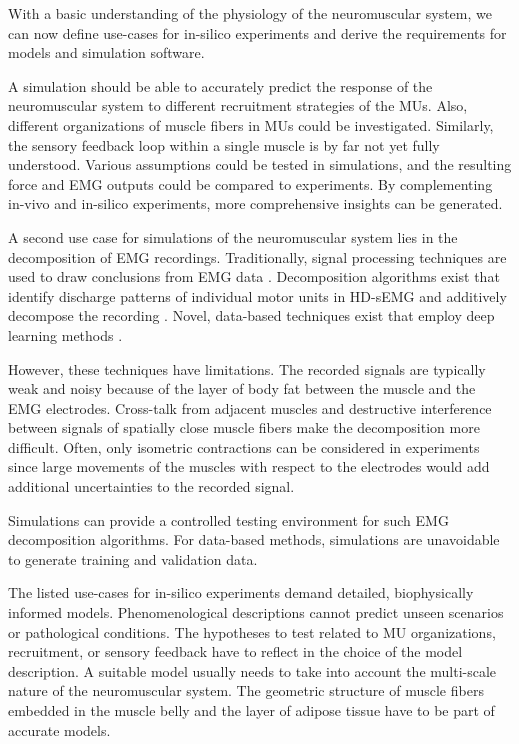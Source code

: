 With a basic understanding of the physiology of the neuromuscular system, we can now define use-cases for in-silico experiments and derive the requirements for models and simulation software.

A simulation should be able to accurately predict the response of the neuromuscular system to different recruitment strategies of the MUs. 
Also, different organizations of muscle fibers in MUs could be investigated. Similarly, the sensory feedback loop within a single muscle is by far not yet fully understood. Various assumptions could be tested in simulations, and the resulting force and EMG outputs could be compared to experiments. By complementing in-vivo and in-silico experiments, more comprehensive insights can be generated.

A second use case for simulations of the neuromuscular system lies in the decomposition of EMG recordings. Traditionally, signal processing techniques are used to draw conclusions from EMG data \cite{Merletti2004,Farina2010}. Decomposition algorithms exist that identify discharge patterns of individual motor units in HD-sEMG and additively decompose the recording \cite{DeLuca2006,Nawab2010,Holobar2007}. 
Novel, data-based techniques exist that employ deep learning methods \cite{Clarke2021}.

However, these techniques have limitations. The recorded signals are typically weak and noisy because of the layer of body fat between the muscle and the EMG electrodes. Cross-talk from adjacent muscles and destructive interference between signals of spatially close muscle fibers make the decomposition more difficult. Often, only isometric contractions can be considered in experiments since large movements of the muscles with respect to the electrodes would add additional uncertainties to the recorded signal.

Simulations can provide a controlled testing environment for such EMG decomposition algorithms. For data-based methods, simulations are unavoidable to generate training and validation data.

The listed use-cases for in-silico experiments demand detailed, biophysically informed models. Phenomenological descriptions cannot predict unseen scenarios or pathological conditions. The hypotheses to test related to MU organizations, recruitment, or sensory feedback have to reflect in the choice of the model description.
A suitable model usually needs to take into account the multi-scale nature of the neuromuscular system. The geometric structure of muscle fibers embedded in the muscle belly and the layer of adipose tissue have to be part of accurate models.


